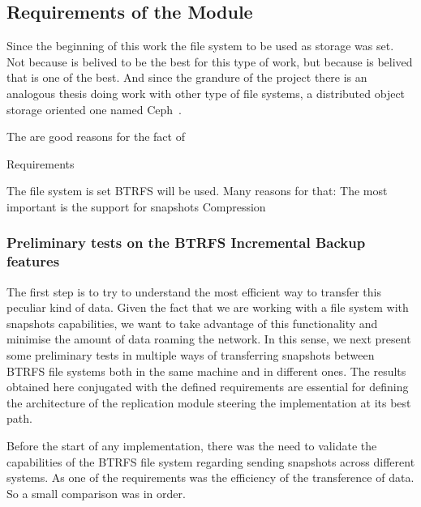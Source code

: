 \subsection{Requirements of the Module}
\label{sub:requirements_icbdrep}

Since the beginning of this work the file system to be used as storage was set. Not because is belived to be the best for this type of work, but because is belived that is one of the best. And since the grandure of the project there is an analogous thesis doing work with other type of file systems, a distributed object storage oriented one named Ceph~\cite{Weil2006}.

The are good reasons for the fact of 

Requirements

The file system is set BTRFS will be used.
Many reasons for that:
The most important is the support for snapshots
Compression


\subsubsection{Preliminary tests on the BTRFS Incremental Backup features}
\label{subsub:pre_test_btrfs}


The first step is to try to understand the most efficient way to transfer this peculiar kind of data. Given the fact that we are working with a file system with snapshots capabilities, we want to take advantage of this functionality and minimise the amount of data roaming the network. In this sense, we next present some preliminary tests in multiple ways of transferring snapshots between BTRFS file systems both in the same machine and in different ones.
The results obtained here conjugated with the defined requirements are essential for defining the architecture of the replication module steering the implementation at its best path.

Before the start of any implementation, there was the need to validate the capabilities of the BTRFS file system regarding sending snapshots across different systems.
As one of the requirements was the efficiency of the transference of data. So a small comparison was in order. 


